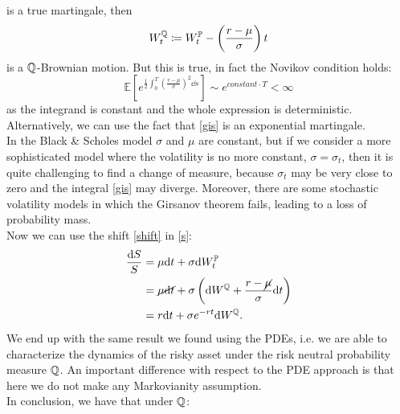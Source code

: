 is a true martingale, then
\begin{equation}\label{shift}
    W^{\mathbb{Q}}_t \coloneqq W_t^{\mathbb{P}} - \left(\frac{r-\mu}{\sigma}\right)t
\end{equation}
is a $\mathbb{Q}$-Brownian motion. But this is true, in fact the Novikov condition holds:
\begin{equation}
    \mathbb{E}\left[e^{\frac{1}{2}\int^T_0\left(\frac{r-\mu}{\sigma}\right)^2\dd s}\right] \sim e^{constant\cdot T} < \infty
\end{equation}
as the integrand is constant and the whole expression is deterministic. Alternatively, we can use the fact that \eqref{gis} is an exponential martingale. \\
In the Black \& Scholes model $\sigma$ and $\mu$ are constant, but if we consider a more sophisticated model where the volatility is no more constant, $\sigma=\sigma_t$, then it is quite challenging to find a change of measure, because $\sigma_t$ may be very close to zero and the integral \eqref{gis} may diverge. Moreover, there are some stochastic volatility models in which the Girsanov theorem fails, leading to a loss of probability mass. \\
Now we can use the shift \eqref{shift} in \eqref{s}:
\begin{align}
    \notag \frac{\dd S}{S} &= \mu \dd t + \sigma \dd W_t^{\mathbb{P}}\\
    &=
    \cancel{\mu \dd t} + \sigma \left(\dd W^{\mathbb{Q}} + \frac{r-\cancel{\mu}}{\sigma}\dd t\right) \\
    &=
    r\dd t + \sigma e^{-rt}\dd W^{\mathbb{Q}}.
\end{align}
We end up with the same result we found using the PDEs, i.e. we are able to characterize the dynamics of the risky asset under the risk neutral probability measure $\mathbb{Q}$. An important difference with respect to the PDE approach is that here we do not make any Markovianity assumption.\\
In conclusion, we have that under $\mathbb{Q}$:
